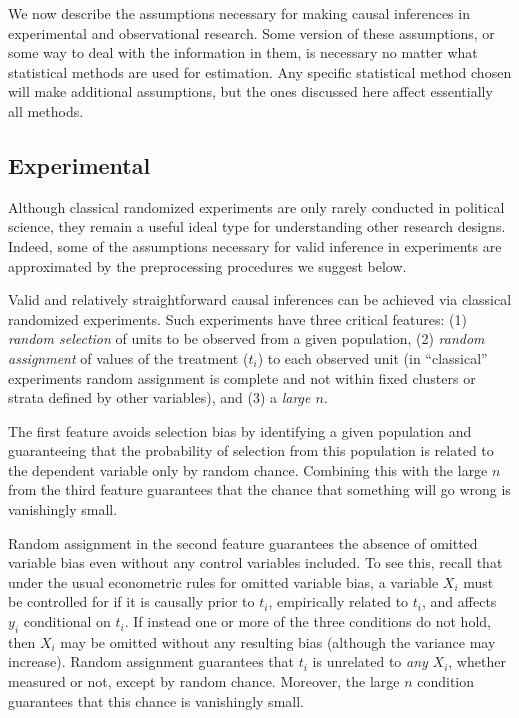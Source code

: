 \documentclass[11pt,titlepage]{article}
\begin{document}
We now describe the assumptions necessary for making causal inferences
in experimental and observational research.  Some version of these
assumptions, or some way to deal with the information in them, is
necessary no matter what statistical methods are used for estimation.
Any specific statistical method chosen will make additional
assumptions, but the ones discussed here affect essentially all
methods.

\subsection{Experimental}

Although classical randomized experiments are only rarely conducted in
political science, they remain a useful ideal type for understanding
other research designs.  Indeed, some of the assumptions necessary for
valid inference in experiments are approximated by the preprocessing
procedures we suggest below.

Valid and relatively straightforward causal inferences can be achieved
via classical randomized experiments.  Such experiments have three
critical features: (1) \emph{random selection} of units to be observed
from a given population, (2) \emph{random assignment} of values of the
treatment ($t_i$) to each observed unit (in ``classical'' experiments
random assignment is complete and not within fixed clusters or strata
defined by other variables), and (3) a \emph{large $n$}.

The first feature avoids selection bias by identifying a given
population and guaranteeing that the probability of selection from
this population is related to the dependent variable only by random
chance.  Combining this with the large $n$ from the third feature
guarantees that the chance that something will go wrong is vanishingly
small.

Random assignment in the second feature guarantees the absence of
omitted variable bias even without any control variables included.  To
see this, recall that under the usual econometric rules for omitted
variable bias, a variable $X_i$ must be controlled for if it is
causally prior to $t_i$, empirically related to $t_i$, and affects
$y_i$ conditional on $t_i$.
If instead one or more of the three conditions
do not hold, then $X_i$ may be omitted without any resulting bias
(although the variance may increase).  Random assignment guarantees
that $t_i$ is unrelated to \emph{any} $X_i$, whether measured or not,
except by random chance.  Moreover, the large $n$ condition guarantees
that this chance is vanishingly small.
\end{document}
